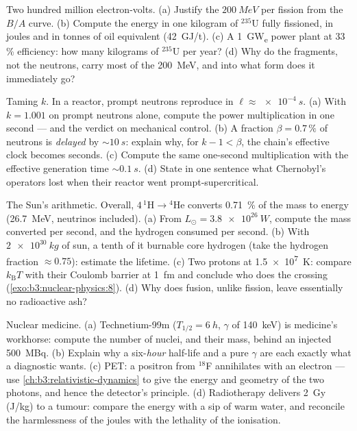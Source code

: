 \begin{exercise}[$\star\star$]\label{exo:b3:nuclear-physics:9}
Two hundred million electron-volts. (a) Justify the
$\qty{200}{MeV}$ per fission from the $B/A$ curve. (b) Compute
the energy in one kilogram of $^{235}$U fully fissioned, in
joules and in tonnes of oil equivalent
(\qty{42}{GJ/t}). (c) A \qty{1}{GW_e} power plant at 33\,\%
efficiency: how many kilograms of $^{235}$U per year? (d) Why do
the fragments, not the neutrons, carry most of the
\qty{200}{MeV}, and into what form does it immediately go?
\end{exercise}

\begin{exercise}[$\star\star\star$]\label{exo:b3:nuclear-physics:10}
Taming $k$. In a reactor, prompt neutrons reproduce in $\ell
\approx \qty{e-4}{s}$. (a) With $k = 1.001$ on prompt neutrons
alone, compute the power multiplication in one second --- and the
verdict on mechanical control. (b) A fraction $\beta =
0.7\,\%$ of neutrons is \emph{delayed} by $\sim\qty{10}{s}$:
explain why, for $k - 1 < \beta$, the chain's effective clock
becomes seconds. (c) Compute the same one-second multiplication
with the effective generation time $\sim\qty{0.1}{s}$. (d) State
in one sentence what Chernobyl's operators lost when their
reactor went prompt-supercritical.
\end{exercise}

\begin{exercise}[$\star\star\star$]\label{exo:b3:nuclear-physics:11}
The Sun's arithmetic. Overall, $4\,^1\text{H} \to {}^4\text{He}$
converts \qty{0.71}{\percent} of the mass to energy
(\qty{26.7}{MeV}, neutrinos included). (a) From $L_\odot =
\qty{3.8e26}{W}$, compute the mass converted per second, and the
hydrogen consumed per second. (b) With $\qty{2e30}{kg}$ of sun,
a tenth of it burnable core hydrogen (take the hydrogen fraction
$\approx0.75$): estimate the lifetime. (c) Two protons at
\qty{1.5e7}{K}: compare $k_{\text{B}}T$ with their Coulomb
barrier at \qty{1}{fm} and conclude who does the crossing
(\cref{exo:b3:nuclear-physics:8}). (d) Why does fusion, unlike
fission, leave essentially no radioactive ash?
\end{exercise}

\begin{exercise}[$\star\star\star$]\label{exo:b3:nuclear-physics:12}
Nuclear medicine. (a) Technetium-99m ($T_{1/2} = \qty{6}{h}$,
$\gamma$ of \qty{140}{keV}) is medicine's workhorse: compute the
number of nuclei, and their mass, behind an injected
\qty{500}{MBq}. (b) Explain why a six-\emph{hour} half-life and a
pure $\gamma$ are each exactly what a diagnostic wants. (c) PET:
a positron from $^{18}$F annihilates with an electron ---
use \cref{ch:b3:relativistic-dynamics} to give the energy and
geometry of the two photons, and hence the detector's principle.
(d) Radiotherapy delivers \qty{2}{Gy} (\unit{J/kg}) to a tumour:
compare the energy with a sip of warm water, and reconcile the
harmlessness of the joules with the lethality of the ionisation.
\end{exercise}

